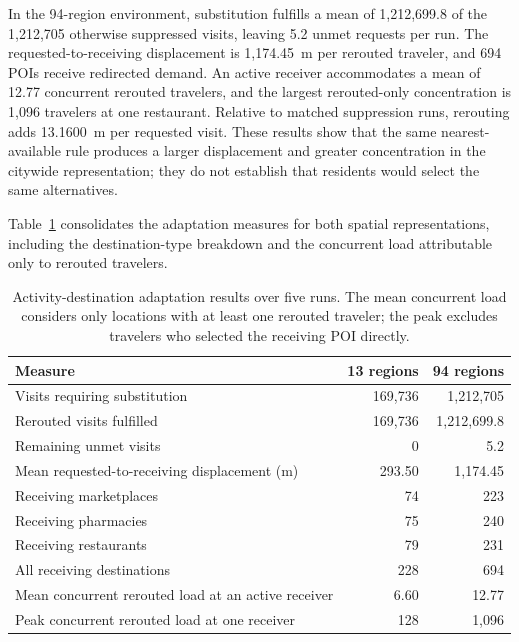 In the 94-region environment, substitution fulfills a mean of 1,212,699.8 of the 1,212,705 otherwise suppressed visits, leaving 5.2 unmet requests per run. The requested-to-receiving displacement is 1,174.45~m per rerouted traveler, and 694 POIs receive redirected demand. An active receiver accommodates a mean of 12.77 concurrent rerouted travelers, and the largest rerouted-only concentration is 1,096 travelers at one restaurant. Relative to matched suppression runs, rerouting adds 13.1600~m per requested visit. These results show that the same nearest-available rule produces a larger displacement and greater concentration in the citywide representation; they do not establish that residents would select the same alternatives.

Table~\ref{tbl:popular_times_adaptation_cost} consolidates the adaptation measures for both spatial representations, including the destination-type breakdown and the concurrent load attributable only to rerouted travelers.

\begin{table}[ht]
\centering
\footnotesize
\caption{Activity-destination adaptation results over five runs. The mean concurrent load considers only locations with at least one rerouted traveler; the peak excludes travelers who selected the receiving POI directly.}
\label{tbl:popular_times_adaptation_cost}
\begin{tabularx}{\linewidth}{@{}Xrr@{}}
\toprule
\textbf{Measure} & \textbf{13 regions} & \textbf{94 regions} \\
\midrule
Visits requiring substitution & 169,736 & 1,212,705 \\
Rerouted visits fulfilled & 169,736 & 1,212,699.8 \\
Remaining unmet visits & 0 & 5.2 \\
Mean requested-to-receiving displacement (m) & 293.50 & 1,174.45 \\
Receiving marketplaces & 74 & 223 \\
Receiving pharmacies & 75 & 240 \\
Receiving restaurants & 79 & 231 \\
All receiving destinations & 228 & 694 \\
Mean concurrent rerouted load at an active receiver & 6.60 & 12.77 \\
Peak concurrent rerouted load at one receiver & 128 & 1,096 \\
\bottomrule
\end{tabularx}
\end{table}

